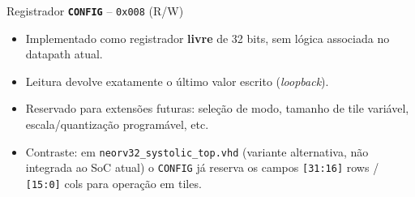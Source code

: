 \documentclass[aspectratio=169,10pt]{beamer}
\newcommand{\bitfield}[2]{\texttt{[#1]} #2}
\newcommand{\regname}[1]{\textbf{\texttt{#1}}}
\begin{document}
\begin{frame}{Registrador \regname{CONFIG} -- \texttt{0x008} (R/W)}
  \begin{itemize}
    \item Implementado como registrador \textbf{livre} de 32 bits, sem lógica associada
      no datapath atual.
    \item Leitura devolve exatamente o último valor escrito (\emph{loopback}).
    \item Reservado para extensões futuras: seleção de modo, tamanho de tile
      variável, escala/quantização programável, etc.
    \item Contraste: em \texttt{neorv32\_systolic\_top.vhd} (variante alternativa,
      não integrada ao SoC atual) o \texttt{CONFIG} já reserva os campos
      \bitfield{31:16}{rows} / \bitfield{15:0}{cols} para operação em tiles.
  \end{itemize}
\end{frame}
\end{document}
